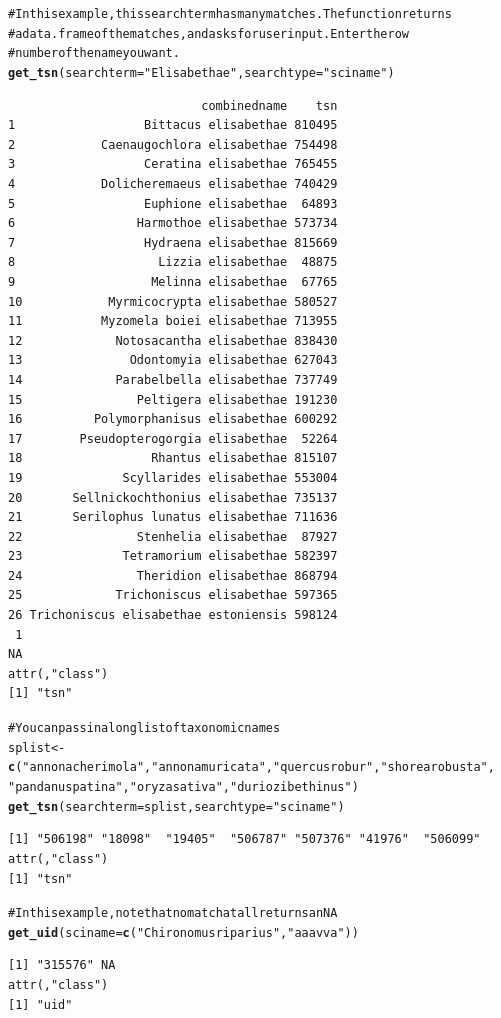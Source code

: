 \documentclass[letterpaper,superscriptaddress,showkeys,longbibliography,10pt]{revtex4-1}\usepackage{graphicx, color}
\makeatletter
\newcommand{\hlfunctioncall}[1]{\textcolor[rgb]{0.501960784313725,0,0.329411764705882}{\textbf{#1}}}%
\newcommand{\hlstring}[1]{\textcolor[rgb]{0.6,0.6,1}{#1}}%
\newcommand{\hlcomment}[1]{\textcolor[rgb]{0.180392156862745,0.6,0.341176470588235}{#1}}%
\newenvironment{kframe}{%
 \def\at@end@of@kframe{}%
 \ifinner\ifhmode%
  \def\at@end@of@kframe{\end{minipage}}%
  \begin{minipage}{\columnwidth}%
 \fi\fi%
 \def\FrameCommand##1{\hskip\@totalleftmargin \hskip-\fboxsep
 \colorbox{shadecolor}{##1}\hskip-\fboxsep
     \hskip-\linewidth \hskip-\@totalleftmargin \hskip\columnwidth}%
 \MakeFramed {\advance\hsize-\width
   \@totalleftmargin\z@ \linewidth\hsize
   \@setminipage}}%
 {\par\unskip\endMakeFramed%
 \at@end@of@kframe}
\newenvironment{knitrout}{}{} %
\makeatother
\begin{document}
\begin{knitrout}
\color{fgcolor}\begin{kframe}
\begin{alltt}
\hlcomment{# In this example, this search term has many matches. The function returns}
\hlcomment{# a data.frame of the matches, and asks for user input. Enter the row}
\hlcomment{# number of the name you want.}
\hlfunctioncall{get_tsn}(searchterm = \hlstring{"Elisabethae"}, searchtype = \hlstring{"sciname"})
\end{alltt}
\begin{verbatim}
                           combinedname    tsn
1                  Bittacus elisabethae 810495
2            Caenaugochlora elisabethae 754498
3                  Ceratina elisabethae 765455
4            Dolicheremaeus elisabethae 740429
5                  Euphione elisabethae  64893
6                 Harmothoe elisabethae 573734
7                  Hydraena elisabethae 815669
8                    Lizzia elisabethae  48875
9                   Melinna elisabethae  67765
10            Myrmicocrypta elisabethae 580527
11           Myzomela boiei elisabethae 713955
12             Notosacantha elisabethae 838430
13               Odontomyia elisabethae 627043
14             Parabelbella elisabethae 737749
15                Peltigera elisabethae 191230
16          Polymorphanisus elisabethae 600292
17        Pseudopterogorgia elisabethae  52264
18                  Rhantus elisabethae 815107
19              Scyllarides elisabethae 553004
20       Sellnickochthonius elisabethae 735137
21       Serilophus lunatus elisabethae 711636
22                Stenhelia elisabethae  87927
23              Tetramorium elisabethae 582397
24                Theridion elisabethae 868794
25             Trichoniscus elisabethae 597365
26 Trichoniscus elisabethae estoniensis 598124
 1 
NA 
attr(,"class")
[1] "tsn"
\end{verbatim}
\begin{alltt}

\hlcomment{# You can pass in a long list of taxonomic names}
splist <- \hlfunctioncall{c}(\hlstring{"annona cherimola"}, \hlstring{"annona muricata"}, \hlstring{"quercus robur"}, \hlstring{"shorea robusta"}, 
    \hlstring{"pandanus patina"}, \hlstring{"oryza sativa"}, \hlstring{"durio zibethinus"})
\hlfunctioncall{get_tsn}(searchterm = splist, searchtype = \hlstring{"sciname"})
\end{alltt}
\begin{verbatim}
[1] "506198" "18098"  "19405"  "506787" "507376" "41976"  "506099"
attr(,"class")
[1] "tsn"
\end{verbatim}
\begin{alltt}

\hlcomment{# In this example, note that no match at all returns an NA}
\hlfunctioncall{get_uid}(sciname = \hlfunctioncall{c}(\hlstring{"Chironomus riparius"}, \hlstring{"aaa vva"}))
\end{alltt}
\begin{verbatim}
[1] "315576" NA      
attr(,"class")
[1] "uid"
\end{verbatim}
\end{kframe}
\end{knitrout}
\end{document}
